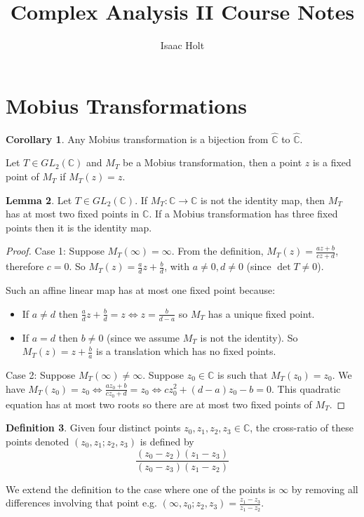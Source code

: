 \documentclass[12pt,a4paper]{article}
\title{Complex Analysis II Course Notes}
\author{Isaac Holt}
\theoremstyle{definition}
\newtheorem{definition}{Definition}[subsection]
\newtheorem{corollary}[definition]{Corollary}
\newtheorem{lemma}[definition]{Lemma}
\begin{document}
\maketitle

\section{Mobius Transformations}

\begin{corollary}
	Any Mobius transformation is a bijection from $\hat{\mathbb{C}}$ to $\hat{\mathbb{C}}$.
\end{corollary}

Let $T \in GL_2(\mathbb{C})$ and $M_T$ be a Mobius transformation, then a point $z$ is a fixed point of $M_T$ if $M_T(z) = z$.

\begin{lemma}
	Let $T \in GL_2(\mathbb{C})$. If $M_T: \mathbb{C} \rightarrow \mathbb{C}$ is not the identity map, then $M_T$ has at most two fixed points in $\mathbb{C}$. If a Mobius transformation has three fixed points then it is the identity map.
\end{lemma}

\begin{proof}
	Case 1: Suppose $M_T(\infty) = \infty$. From the definition, $M_T(z) = \frac{az + b}{cz + d}$, therefore $c = 0$. So $M_T(z) = \frac{a}{d}z + \frac{b}{d}$, with $a \ne 0, d \ne 0$ (since $\det T \ne 0$).

	Such an affine linear map has at most one fixed point because:
	\begin{itemize}
		\item If $a \ne d$ then $\frac{a}{d}z + \frac{b}{d} = z \Longleftrightarrow z = \frac{b}{d - a}$ so $M_T$ has a unique fixed point.
		\item If $a = d$ then $b \ne 0$ (since we assume $M_T$ is not the identity). So $M_T(z) = z + \frac{b}{a}$ is a translation which has no fixed points.
	\end{itemize}

	Case 2: Suppose $M_T(\infty) \ne \infty$. Suppose $z_0 \in \mathbb{C}$ is such that $M_T(z_0) = z_0$. We have $M_T(z_0) = z_0 \Longleftrightarrow \frac{a z_0 + b}{c z_0 + d} = z_0 \Longleftrightarrow c z_0 ^ 2 + (d - a)z_0 - b = 0$. This quadratic equation has at most two roots so there are at most two fixed points of $M_T$.
\end{proof}

\begin{definition}
	Given four distinct points $z_0, z_1, z_2, z_3 \in \mathbb{C}$, the cross-ratio of these points denoted $(z_0, z_1; z_2, z_3)$ is defined by
	\[\frac{(z_0 - z_2)(z_1 - z_3)}{(z_0 - z_3)(z_1 - z_2)}\]

	We extend the definition to the case where one of the points is $\infty$ by removing all differences involving that point e.g. $(\infty, z_0; z_2, z_3) = \frac{z_1 - z_3}{z_1 - z_2}$.
\end{definition}
\end{document}
